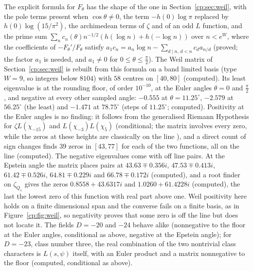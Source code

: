The explicit formula for $F_\theta$ has the shape of the one in Section~\ref{cp:sec:weil}, with the pole terms present when $\cos\theta\ne0$, the term $-h(0)\log\pi$ replaced by $h(0)\log(15/\pi^2)$, the archimedean terms of $\zeta$ and of an odd $L$ function, and the prime sum $\sum_{n}c_n(\theta)n^{-1/2}(h(\log n)+h(-\log n))$ over $n<e^W$, where the coefficients of $-F_\theta'/F_\theta$ satisfy $a_1c_n=a_n\log n-\sum_{d\mid n,\,d<n}c_da_{n/d}$ (proved; the factor $a_1$ is needed, and $a_1\ne0$ for $0\le\theta\le\frac\pi2$). The Weil matrix of Section~\ref{cp:sec:weil} is rebuilt from this formula on a band limited basis (type $W=9$, so integers below $8104$) with $58$ centres on $[40,80]$ (computed). Its least eigenvalue is at the rounding floor, of order $10^{-10}$, at the Euler angles $\theta=0$ and $\frac\pi2$, and negative at every other sampled angle: $-0.555$ at $\theta=11.25^\circ$, $-2.579$ at $56.25^\circ$ (the least) and $-1.471$ at $78.75^\circ$ (steps of $11.25^\circ$; computed). Positivity at the Euler angles is no finding: it follows from the generalised Riemann Hypothesis for $\zeta L(\chi_{-15})$ and $L(\chi_{-3})L(\chi_5)$ (conditional; the matrix involves every zero, while the zeros at these heights are classically on the line \cite{Rumely93}), and a direct count of sign changes finds $39$ zeros in $[43,77]$ for each of the two functions, all on the line (computed). The negative eigenvalues come with off line pairs. At the Epstein angle the matrix places pairs at $43.63\mp0.356i$, $47.53\mp0.413i$, $61.42\mp0.526i$, $64.81\mp0.229i$ and $66.78\mp0.172i$ (computed), and a root finder on $\zeta_{Q_1}$ gives the zeros $0.8558+43.6317i$ and $1.0260+61.4228i$ (computed), the last the lowest zero of this function with real part above one. Weil positivity here holds on a finite dimensional span and the converse fails on a finite basis, as in Figure~\ref{cp:fig:weil}, so negativity proves that some zero is off the line but does not locate it.  The fields $D=-20$ and $-24$ behave alike (nonnegative to the floor at the Euler angles, conditional as above, negative at the Epstein angle); for $D=-23$, class number three, the real combination of the two nontrivial class characters is $L(s,\psi)$ itself, with an Euler product and a matrix nonnegative to the floor (computed, conditional as above).

